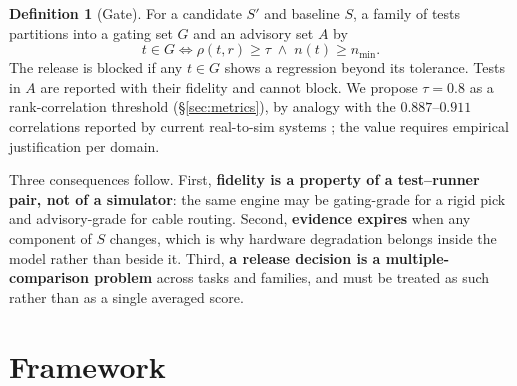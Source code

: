 \documentclass[11pt]{article}
\theoremstyle{definition}
\newtheorem{definition}{Definition}
\newcommand{\sut}{\ensuremath{S}}
\begin{document}
\begin{definition}[Gate]
For a candidate $\sut'$ and baseline $\sut$, a family of tests partitions into a gating set
$G$ and an advisory set $A$ by
\begin{equation}
  t \in G \iff \rho(t,r) \ge \tau \;\wedge\; n(t) \ge n_{\min}.
\end{equation}
The release is blocked if any $t \in G$ shows a regression beyond its tolerance. Tests in
$A$ are reported with their fidelity and cannot block. We propose $\tau = 0.8$ as a
rank-correlation threshold (\S\ref{sec:metrics}), by analogy with the $0.887$--$0.911$
correlations reported by current real-to-sim systems \citep{simfoundry,robosnap}; the value
requires empirical justification per domain.
\end{definition}

Three consequences follow. First, \textbf{fidelity is a property of a test--runner pair, not
of a simulator}: the same engine may be gating-grade for a rigid pick and advisory-grade for
cable routing. Second, \textbf{evidence expires} when any component of $\sut$ changes, which
is why hardware degradation belongs inside the model rather than beside it. Third, \textbf{a
release decision is a multiple-comparison problem} across tasks and families, and must be
treated as such rather than as a single averaged score.

\section{Framework}
\end{document}
